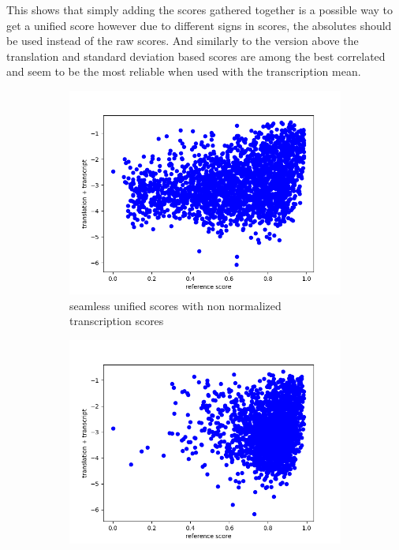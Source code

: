 This shows that simply adding the scores gathered together is a possible way to get a unified score however due to different signs in scores, the absolutes should be used instead of the raw scores. And similarly to the version above the translation and standard deviation based scores are among the best correlated and seem to be the most reliable when used with the transcription mean. 
\begin{figure}[ht]
    \centering
    \begin{subfigure}{0.4\textwidth}
        \includegraphics[width=\linewidth]{Latex/sections/images/seamlesstranscripttranslation.png}
        \caption{seamless unified scores with non normalized transcription scores}
    \end{subfigure}
    \begin{subfigure}{0.4\textwidth}
        \includegraphics[width=\linewidth]{Latex/sections/images/dlmtranscripttranslation.png}

\end{subfigure}
\end{figure}
